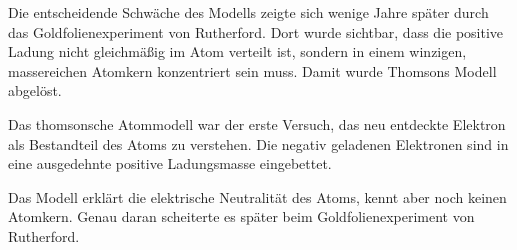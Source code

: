 Die entscheidende Schwäche des Modells zeigte sich wenige Jahre später durch
das Goldfolienexperiment von Rutherford. Dort wurde sichtbar, dass die positive
Ladung nicht gleichmäßig im Atom verteilt ist, sondern in einem winzigen,
massereichen Atomkern konzentriert sein muss. Damit wurde Thomsons Modell
abgelöst.

\begin{HistoryBox}
	
	\label{box:thomson-rosinenkuchenmodell}
	Das thomsonsche Atommodell war der erste Versuch, das neu entdeckte Elektron
	als Bestandteil des Atoms zu verstehen. Die negativ geladenen Elektronen sind
	in eine ausgedehnte positive Ladungsmasse eingebettet.
	
	Das Modell erklärt die elektrische Neutralität des Atoms, kennt aber noch
	keinen Atomkern. Genau daran scheiterte es später beim Goldfolienexperiment
	von Rutherford.
	
\end{HistoryBox}